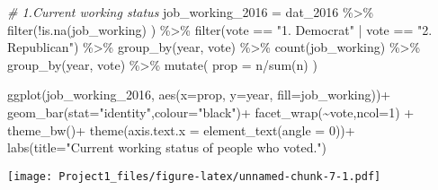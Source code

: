 \documentclass[
]{article}
\newenvironment{Shaded}{\begin{snugshade}}{\end{snugshade}}
\newcommand{\AttributeTok}[1]{\textcolor[rgb]{0.77,0.63,0.00}{#1}}
\newcommand{\CommentTok}[1]{\textcolor[rgb]{0.56,0.35,0.01}{\textit{#1}}}
\newcommand{\DecValTok}[1]{\textcolor[rgb]{0.00,0.00,0.81}{#1}}
\newcommand{\FunctionTok}[1]{\textcolor[rgb]{0.00,0.00,0.00}{#1}}
\newcommand{\NormalTok}[1]{#1}
\newcommand{\OtherTok}[1]{\textcolor[rgb]{0.56,0.35,0.01}{#1}}
\newcommand{\SpecialCharTok}[1]{\textcolor[rgb]{0.00,0.00,0.00}{#1}}
\newcommand{\StringTok}[1]{\textcolor[rgb]{0.31,0.60,0.02}{#1}}
\begin{document}
\begin{Shaded}
\begin{Highlighting}[]
\CommentTok{\# 1.Current working status}
\NormalTok{job\_working\_2016 }\OtherTok{=}\NormalTok{ dat\_2016 }\SpecialCharTok{\%\textgreater{}\%}
  \FunctionTok{filter}\NormalTok{(}\SpecialCharTok{!}\FunctionTok{is.na}\NormalTok{(job\_working) ) }\SpecialCharTok{\%\textgreater{}\%}
  \FunctionTok{filter}\NormalTok{(vote }\SpecialCharTok{==} \StringTok{"1. Democrat"} \SpecialCharTok{|}\NormalTok{ vote }\SpecialCharTok{==} \StringTok{"2. Republican"}\NormalTok{) }\SpecialCharTok{\%\textgreater{}\%}
  \FunctionTok{group\_by}\NormalTok{(year, vote) }\SpecialCharTok{\%\textgreater{}\%}
  \FunctionTok{count}\NormalTok{(job\_working) }\SpecialCharTok{\%\textgreater{}\%}
  \FunctionTok{group\_by}\NormalTok{(year, vote) }\SpecialCharTok{\%\textgreater{}\%}
  \FunctionTok{mutate}\NormalTok{(}
    \AttributeTok{prop =}\NormalTok{ n}\SpecialCharTok{/}\FunctionTok{sum}\NormalTok{(n)}
\NormalTok{  )}

\FunctionTok{ggplot}\NormalTok{(job\_working\_2016,}
       \FunctionTok{aes}\NormalTok{(}\AttributeTok{x=}\NormalTok{prop, }\AttributeTok{y=}\NormalTok{year, }\AttributeTok{fill=}\NormalTok{job\_working))}\SpecialCharTok{+}
  \FunctionTok{geom\_bar}\NormalTok{(}\AttributeTok{stat=}\StringTok{"identity"}\NormalTok{,}\AttributeTok{colour=}\StringTok{"black"}\NormalTok{)}\SpecialCharTok{+}
  \FunctionTok{facet\_wrap}\NormalTok{(}\SpecialCharTok{\textasciitilde{}}\NormalTok{vote,}\AttributeTok{ncol=}\DecValTok{1}\NormalTok{) }\SpecialCharTok{+}
  \FunctionTok{theme\_bw}\NormalTok{()}\SpecialCharTok{+}
  \FunctionTok{theme}\NormalTok{(}\AttributeTok{axis.text.x =} \FunctionTok{element\_text}\NormalTok{(}\AttributeTok{angle =} \DecValTok{0}\NormalTok{))}\SpecialCharTok{+}
  \FunctionTok{labs}\NormalTok{(}\AttributeTok{title=}\StringTok{"Current working status of people who voted."}\NormalTok{)}
\end{Highlighting}
\end{Shaded}

\texttt{[image: Project1\_files/figure-latex/unnamed-chunk-7-1.pdf]}
\end{document}
